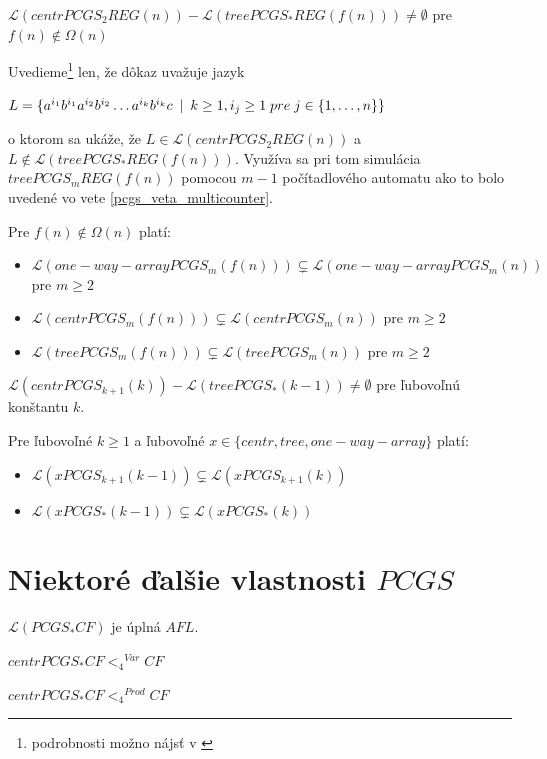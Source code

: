 \begin{veta}
$\mathcal{L}(centrPCGS_2REG(n))-\mathcal{L}(treePCGS_*REG(f(n)))\neq\emptyset$
pre $f(n)\not\in\Omega (n)$
\end{veta}

\begin{dokaz}
Uvedieme\footnote{podrobnosti možno nájsť v \cite{some}} len, že
dôkaz uvažuje jazyk \newline \centerline{$L=\{
a^{i_1}b^{i_1}a^{i_2}b^{i_2}\dots a^{i_k}b^{i_k}c\enspace |\enspace k\geq 1,
i_j\geq 1\; pre\; j\in\{ 1,\dots ,n\}\}$} o ktorom sa ukáže, že
$L\in \mathcal{L}(centrPCGS_2REG(n))$ a
$L\not\in\mathcal{L}(treePCGS_*REG(f(n)))$. Využíva sa pri tom
simulácia $treePCGS_mREG(f(n))$ pomocou $m-1$ počítadlového
automatu ako to bolo uvedené vo vete \ref{pcgs_veta_multicounter}.
\end{dokaz}

\begin{veta}
Pre $f(n)\not\in\Omega (n)$ platí:
\begin{itemize}
  \item $\mathcal{L}(one-way-arrayPCGS_m(f(n)))\subsetneq\mathcal{L}(one-way-arrayPCGS_m(n))$
  pre $m\geq 2$
  \item $\mathcal{L}(centrPCGS_m(f(n)))\subsetneq\mathcal{L}(centrPCGS_m(n))$
  pre $m\geq 2$
  \item $\mathcal{L}(treePCGS_m(f(n)))\subsetneq\mathcal{L}(treePCGS_m(n))$
  pre $m\geq 2$
\end{itemize}
\end{veta}

\begin{veta}
$\mathcal{L}(centrPCGS_{k+1}(k))-\mathcal{L}(treePCGS_*(k-1))\neq\emptyset$
pre ľubovoľnú konštantu $k$.
\end{veta}

\begin{veta}
Pre ľubovoľné $k\geq 1$ a ľubovoľné
$x\in\{centr,tree,one-way-array\}$ platí:
\begin{itemize}
  \item $\mathcal{L}(xPCGS_{k+1}(k-1))\subsetneq\mathcal{L}(xPCGS_{k+1}(k))$
  \item $\mathcal{L}(xPCGS_*(k-1))\subsetneq\mathcal{L}(xPCGS_*(k))$
\end{itemize}
\end{veta}

\section{Niektoré ďalšie vlastnosti $PCGS$}

\begin{veta}
$\mathcal{L}(PCGS_*CF)$ je úplná $AFL$.
\end{veta}

\begin{veta}
$centrPCGS_*CF {<_4}^{Var} CF$
\end{veta}

\begin{veta}
$centrPCGS_*CF {<_4}^{Prod} CF$
\end{veta}
